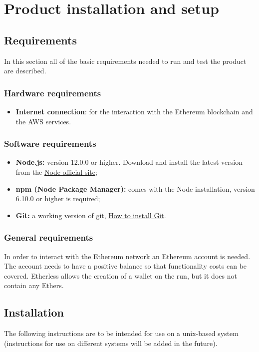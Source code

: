 \section{Product installation and setup}
  \subsection{Requirements}
    In this section all of the basic requirements needed to run and test the product are described.
    \subsubsection{Hardware requirements}
      \begin{itemize}
      	\item \textbf{Internet connection}: for the interaction with the Ethereum blockchain and the AWS services.
      \end{itemize}
    \subsubsection{Software requirements}
      \begin{itemize}
        \item \textbf{Node.js:} version 12.0.0 or higher. Download and install the latest version from the \href{https://nodejs.org/it/download/}{Node official site};
        \item \textbf{npm (Node Package Manager):} comes with the Node installation, version 6.10.0 or higher is required;
        \item \textbf{Git:} a working version of git, \href{https://git-scm.com/book/en/v2/Getting-Started-Installing-Git}{How to install Git}.
      \end{itemize}
    \subsubsection{General requirements}
      In order to interact with the Ethereum network an Ethereum account is needed. The account needs to have a positive balance so that functionality costs can be covered. Etherless allows the creation of a wallet on the run, but it does not contain any Ethers.
  \subsection{Installation}
    The following instructions are to be intended for use on a unix-based system (instructions for use on different systems will be added in the future).

